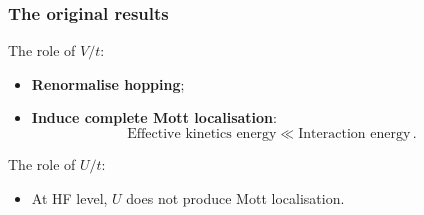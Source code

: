 \begin{frame}
	\frametitle{The original results}
	The role of $V/t$:
	\begin{itemize}
		\item \textbf{Renormalise hopping};
		\item \textbf{Induce complete Mott localisation}:
		\[
			\text{Effective kinetics energy} \ll \text{Interaction energy} \, .
		\]
	\end{itemize}
	The role of $U/t$:
	\begin{itemize}
		\item At HF level, $U$ does not produce Mott localisation.
	\end{itemize}
\end{frame}